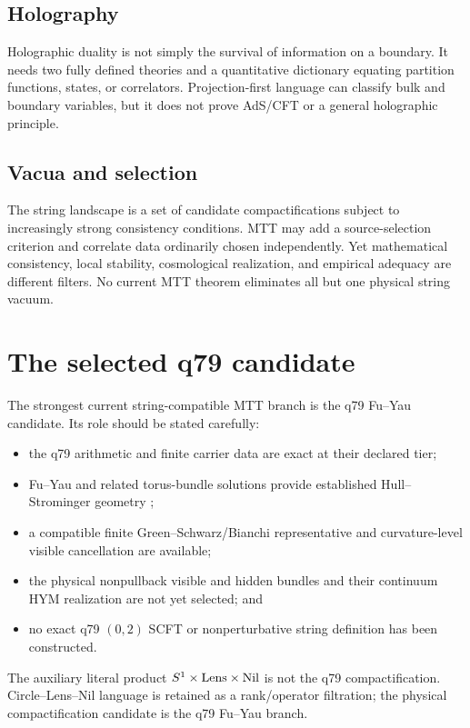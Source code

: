 \documentclass[11pt]{article}
\begin{document}
\subsection{Holography}

Holographic duality is not simply the survival of information on a boundary.
It needs two fully defined theories and a quantitative dictionary equating
partition functions, states, or correlators. Projection-first language can
classify bulk and boundary variables, but it does not prove AdS/CFT or a
general holographic principle.

\subsection{Vacua and selection}

The string landscape is a set of candidate compactifications subject to
increasingly strong consistency conditions. MTT may add a source-selection
criterion and correlate data ordinarily chosen independently. Yet
mathematical consistency, local stability, cosmological realization, and
empirical adequacy are different filters. No current MTT theorem eliminates
all but one physical string vacuum.

\section{The selected q79 candidate}

The strongest current string-compatible MTT branch is the q79 Fu--Yau
candidate. Its role should be stated carefully:
\begin{itemize}[leftmargin=*]
\item the q79 arithmetic and finite carrier data are exact at their declared
tier;
\item Fu--Yau and related torus-bundle solutions provide established
Hull--Strominger geometry \cite{FuYau,Fino2019};
\item a compatible finite Green--Schwarz/Bianchi representative and
curvature-level visible cancellation are available;
\item the physical nonpullback visible and hidden bundles and their
continuum HYM realization are not yet selected; and
\item no exact q79 \((0,2)\) SCFT or nonperturbative string definition has
been constructed.
\end{itemize}
The auxiliary literal product \(S^1\times{\rm Lens}\times{\rm Nil}\) is not
the q79 compactification. Circle--Lens--Nil language is retained as a
rank/operator filtration; the physical compactification candidate is the
q79 Fu--Yau branch.
\end{document}
